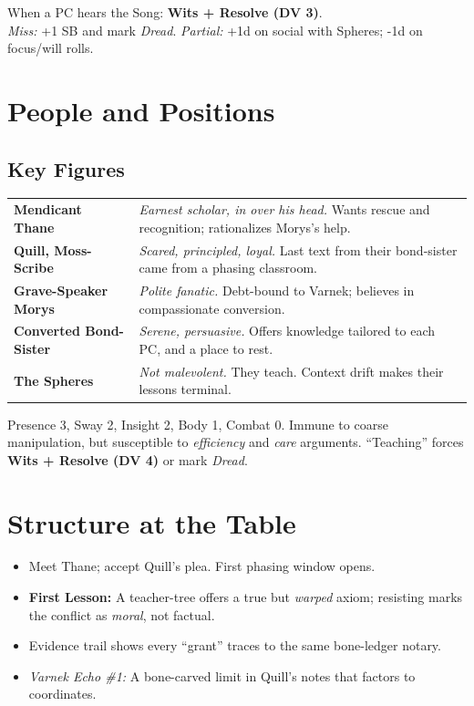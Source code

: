 \documentclass[11pt,twoside]{book}
\newcommand{\Mechanic}[2]{%
  \begin{mechanicbox}[frametitle={#1}]
    #2
  \end{mechanicbox}
}
\newcommand{\Session}[2]{%
  \begin{adventurebox}[frametitle={Session #1: #2}]
}
\newcommand{\EndSession}{%
  \end{adventurebox}
}
\begin{document}
\Mechanic{Spheres' Siren}{
When a PC hears the Song: \textbf{Wits + Resolve (DV 3)}.\\
\emph{Miss:} +1 SB and mark \emph{Dread}. \quad
\emph{Partial:} +1d on social with Spheres; -1d on focus/will rolls.
}

\chapter{People and Positions}

\section*{Key Figures}
\begin{tabularx}{\linewidth}{@{}>{\bfseries}l X@{}}
Mendicant Thane & \emph{Earnest scholar, in over his head.} Wants rescue and recognition; rationalizes Morys's help.\\
Quill, Moss-Scribe & \emph{Scared, principled, loyal.} Last text from their bond-sister came from a phasing classroom.\\
Grave-Speaker Morys & \emph{Polite fanatic.} Debt-bound to Varnek; believes in compassionate conversion.\\
Converted Bond-Sister & \emph{Serene, persuasive.} Offers knowledge tailored to each PC, and a place to rest.\\
The Spheres & \emph{Not malevolent.} They teach. Context drift makes their lessons terminal.\\
\end{tabularx}

\Mechanic{Converted Stat Sketch}{
Presence 3, Sway 2, Insight 2, Body 1, Combat 0. Immune to coarse manipulation, but susceptible to \emph{efficiency} and \emph{care} arguments. ``Teaching'' forces \textbf{Wits + Resolve (DV 4)} or mark \emph{Dread}.
}

\chapter{Structure at the Table}

%
\Session{1}{The Sound that Explains}
\begin{itemize}[leftmargin=*]
  \item Meet Thane; accept Quill's plea. First phasing window opens.
  \item \textbf{First Lesson:} A teacher-tree offers a true but \emph{warped} axiom; resisting marks the conflict as \emph{moral}, not factual.
  \item Evidence trail shows every ``grant'' traces to the same bone-ledger notary.
  \item \emph{Varnek Echo \#1:} A bone-carved limit in Quill's notes that factors to coordinates.
\end{itemize}
\EndSession
\end{document}
